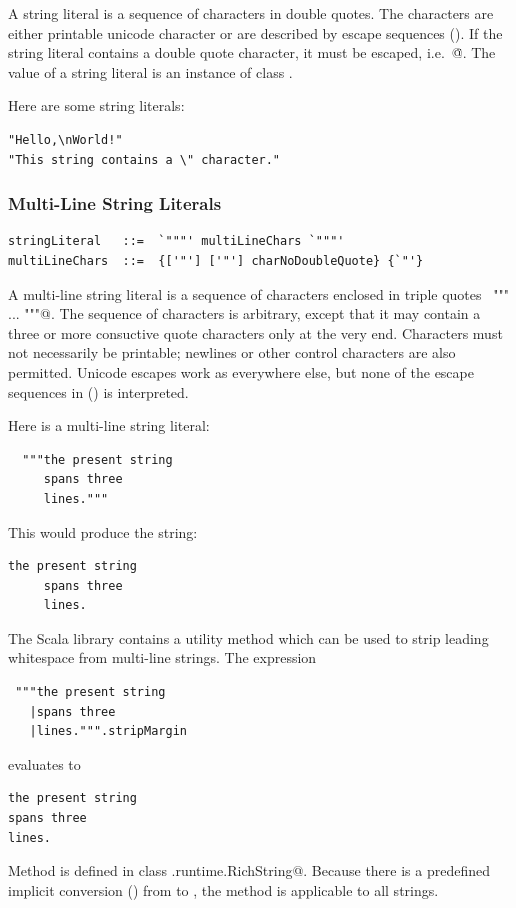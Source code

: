 A string literal is a sequence of characters in double quotes.  The
characters are either printable unicode character or are described by
escape sequences (). If the string literal
contains a double quote character, it must be escaped,
i.e.\ \lstinline@\"@. The value of a string literal is an instance of
class \lstinline@String@. 

\example
Here are some string literals:
\begin{lstlisting}
"Hello,\nWorld!"       
"This string contains a \" character."
\end{lstlisting}

\subsubsection*{Multi-Line String Literals}

\syntax\begin{lstlisting}
stringLiteral   ::=  `"""' multiLineChars `"""'
multiLineChars  ::=  {['"'] ['"'] charNoDoubleQuote} {`"'}
\end{lstlisting}

A multi-line string literal is a sequence of characters enclosed in
triple quotes ~\lstinline@""" ... """@. The sequence of characters is
arbitrary, except that it may contain a three or more consuctive quote characters
only at the very end. Characters
must not necessarily be printable; newlines or other
control characters are also permitted.  Unicode escapes work as everywhere else, but none
of the escape sequences in () is interpreted.

\example Here is a multi-line string literal:
\begin{lstlisting}
  """the present string
     spans three 
     lines."""
\end{lstlisting}
This would produce the string:
\begin{lstlisting}
the present string
     spans three 
     lines.
\end{lstlisting}
The Scala library contains a utility method \lstinline@stripMargin@
which can be used to strip leading whitespace from multi-line strings.
The expression
\begin{lstlisting}
 """the present string
   |spans three 
   |lines.""".stripMargin
\end{lstlisting}
evaluates to
\begin{lstlisting}
the present string
spans three 
lines.
\end{lstlisting}
Method \lstinline@stripMargin@ is defined in class
\lstinline@scala.runtime.RichString@. Because there is a predefined
implicit conversion () from  to
, the method is applicable to all strings.

